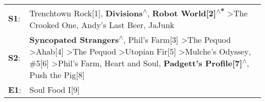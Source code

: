 \begin{supertabular}{p{0.03\textwidth}p{0.92\textwidth}}
 \textbf{S1}:  &                                                                                                                                                                                                                                                                                                                          Trenchtown Rock[1]\textsuperscript{}, \enspace \textbf{Divisions\textsuperscript{$\wedge$}}, \enspace \textbf{Robot World[2]\textsuperscript{$\wedge$*}} \textgreater \enspace The Crooked One\textsuperscript{}, \enspace Andy's Last Beer\textsuperscript{}, \enspace JaJunk\textsuperscript{}  \enspace  \\
 \textbf{S2}:  &  \textbf{Syncopated Strangers\textsuperscript{$\wedge$}}, \enspace Phil's Farm[3]\textsuperscript{} \textgreater \enspace The Pequod\textsuperscript{} \textgreater \enspace Ahab[4]\textsuperscript{} \textgreater \enspace The Pequod\textsuperscript{} \textgreater \enspace Utopian Fir[5]\textsuperscript{} \textgreater \enspace Mulche's Odyssey\textsuperscript{}, \enspace \#5[6]\textsuperscript{} \textgreater \enspace Phil's Farm\textsuperscript{}, \enspace Heart and Soul\textsuperscript{}, \enspace \textbf{Padgett's Profile[7]\textsuperscript{$\wedge$}}, \enspace Push the Pig[8]\textsuperscript{}  \enspace  \\
 \textbf{E1}:  &                                                                                                                                                                                                                                                                                                                                                                                                                                                                                                                                                                                          Soul Food I[9]\textsuperscript{}  \enspace  \\
\end{supertabular}
